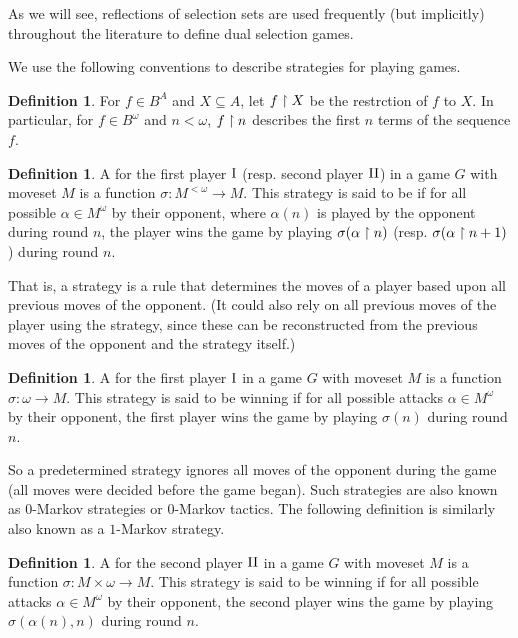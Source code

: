 \documentclass{amsart}
\theoremstyle{plain}
\theoremstyle{definition}
\newtheorem{definition}[theorem]{Definition}
\theoremstyle{remark}
\theoremstyle{plain}
\theoremstyle{definition}
\theoremstyle{remark}
\begin{document}
As we will see, reflections of selection sets are used frequently (but implicitly) 
throughout the literature to define dual selection games.

We use the following conventions to describe strategies for playing games.

\begin{definition}
  For \(f\in B^A\) and \(X\subseteq A\), let \(f\restriction X\) be the restrction of \(f\)
  to \(X\). In particular, for \(f\in B^\omega\) and \(n<\omega\), \(f\restriction n\)
  describes the first \(n\) terms of the sequence \(f\).
\end{definition}

\begin{definition}
  A  for the first player \(\mathrm{I}\) (resp. second player \(\mathrm{II}\))
  in a game \(G\) with moveset \(M\) is a function
  \(\sigma:M^{<\omega}\to M\). This strategy is said to be  if
  for all possible  \(\alpha\in M^\omega\) by their opponent,
  where \(\alpha(n)\) is played by the opponent during round \(n\),
  the player wins the game by playing \(\sigma(\alpha\restriction n)\)
  (resp. \(\sigma(\alpha\restriction n+1)\)) during round \(n\).
\end{definition}

That is, a strategy is a rule that determines the moves of a player based upon
all previous moves of the opponent. (It could also rely on all previous
moves of the player using the strategy, since these can be reconstructed from
the previous moves of the opponent and the strategy itself.)

\begin{definition}
  A  for the first player \(\mathrm{I}\)
  in a game \(G\) with moveset \(M\) is a function
  \(\sigma:\omega\to M\). This strategy is said to be winning if
  for all possible attacks \(\alpha\in M^\omega\) by their opponent,
  the first player wins the game by playing \(\sigma(n)\)
  during round \(n\).
\end{definition}

So a predetermined strategy ignores all moves of the opponent during the
game (all moves were decided before the game began). Such strategies
are also known as \(0\)-Markov strategies or \(0\)-Markov tactics.
The following definition is similarly also known as a \(1\)-Markov strategy.

\begin{definition}
  A  for the second player \(\mathrm{II}\)
  in a game \(G\) with moveset \(M\) is a function
  \(\sigma:M\times\omega\to M\). This strategy is said to be winning if
  for all possible attacks \(\alpha\in M^\omega\) by their opponent,
  the second player wins the game by playing \(\sigma(\alpha(n),n)\)
  during round \(n\).
\end{definition}
\end{document}
